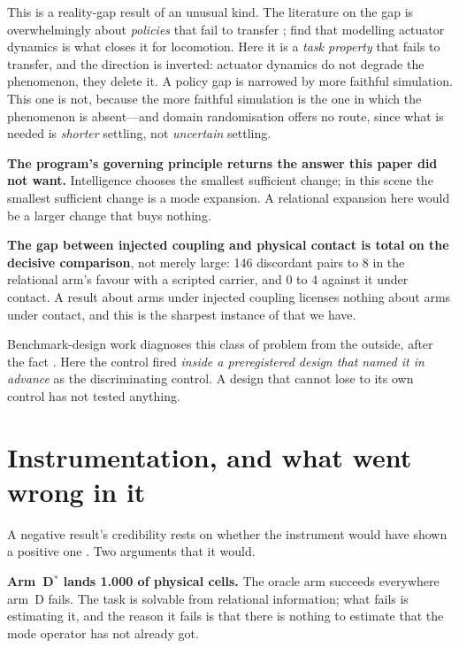 \documentclass[10pt]{article}
\begin{document}
This is a reality-gap result of an unusual kind. The literature on the gap is
overwhelmingly about \emph{policies} that fail to transfer
\citep{jakobi1995noise,tobin2017domain}; \citet{tan2018simtoreal} find that
modelling actuator dynamics is what closes it for locomotion. Here it is a
\emph{task property} that fails to transfer, and the direction is inverted:
actuator dynamics do not degrade the phenomenon, they delete it. A policy gap is
narrowed by more faithful simulation. This one is not, because the more faithful
simulation is the one in which the phenomenon is absent---and domain
randomisation offers no route, since what is needed is \emph{shorter} settling,
not \emph{uncertain} settling.

\textbf{The program's governing principle returns the answer this paper did not
want.} Intelligence chooses the smallest sufficient change; in this scene the
smallest sufficient change is a mode expansion. A relational expansion here would
be a larger change that buys nothing.

\textbf{The gap between injected coupling and physical contact is total on the
decisive comparison}, not merely large: 146 discordant pairs to 8 in the
relational arm's favour with a scripted carrier, and 0 to 4 against it under
contact. A result about arms under injected coupling licenses nothing about arms
under contact, and this is the sharpest instance of that we have.

Benchmark-design work diagnoses this class of problem from the outside, after the
fact \citep{dehghani2021benchmark,beyer2020imagenet,lucic2018gans}. Here the
control fired \emph{inside a preregistered design that named it in advance} as
the discriminating control. A design that cannot lose to its own control has not
tested anything.

\section{Instrumentation, and what went wrong in it}

A negative result's credibility rests on whether the instrument would have shown
a positive one \citep{henderson2018matters}. Two arguments that it would.

\textbf{Arm~D\(^{*}\) lands 1.000 of physical cells.} The oracle arm succeeds
everywhere arm~D fails. The task is solvable from relational information; what
fails is estimating it, and the reason it fails is that there is nothing to
estimate that the mode operator has not already got.
\end{document}
